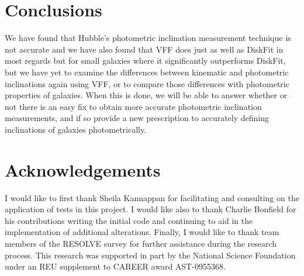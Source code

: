 \documentclass{emulateapj}
\begin{document}

\section{Conclusions}
\large We have found that Hubble's photometric inclination measurement technique is not accurate and we have also found that VFF does just as well as DiskFit in most regards but for small galaxies where it significantly outperforms DiskFit, but we have yet to examine the differences between kinematic and photometric inclinations again using VFF, or to compare those differences with photometric properties of galaxies. When this is done, we will be able to answer whether or not there is an easy fix to obtain more accurate photometric inclination measurements, and if so provide a new prescription to accurately defining inclinations of galaxies photometrically. 

\section{Acknowledgements}
\large I would like to first thank Sheila Kannappan for facilitating and consulting on the application of tests in this project. I would like also to thank Charlie Bonfield for his contributions writing the initial code and continuing to aid in the implementation of additional alterations. Finally, I would like to thank team members of the RESOLVE survey for further assistance during the research process. This research was supported in part by the National Science Foundation under an REU supplement to CAREER award AST-0955368.
\end{document}
